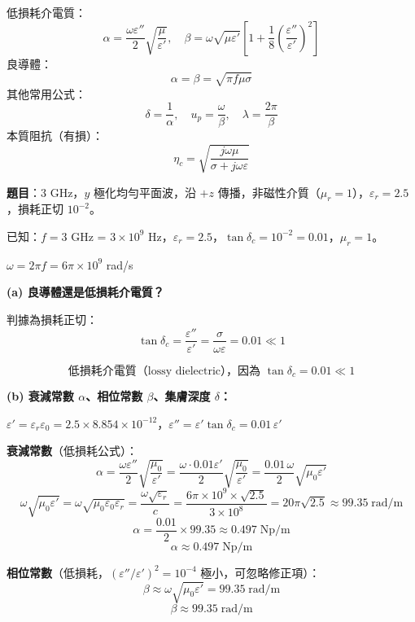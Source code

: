 \documentclass[12pt,a4paper]{article}
\begin{document}
\begin{formulabox}
低損耗介電質：
\[
  \alpha = \frac{\omega\varepsilon''}{2}\sqrt{\frac{\mu}{\varepsilon'}}, \quad
  \beta = \omega\sqrt{\mu\varepsilon'}\left[1 + \frac{1}{8}\left(\frac{\varepsilon''}{\varepsilon'}\right)^2\right]
\]
良導體：
\[
  \alpha = \beta = \sqrt{\pi f \mu \sigma}
\]
其他常用公式：
\[
  \delta = \frac{1}{\alpha}, \quad u_p = \frac{\omega}{\beta}, \quad \lambda = \frac{2\pi}{\beta}
\]
本質阻抗（有損）：
\[
  \eta_c = \sqrt{\frac{j\omega\mu}{\sigma + j\omega\varepsilon}}
\]
\end{formulabox}

\textbf{題目}：3 GHz，$y$ 極化均勻平面波，沿 $+z$ 傳播，非磁性介質（$\mu_r = 1$），$\varepsilon_r = 2.5$，損耗正切 $10^{-2}$。

\begin{solutionbox}[詳解]

已知：$f = 3$ GHz = $3\times10^9$ Hz，$\varepsilon_r = 2.5$，$\tan\delta_c = 10^{-2} = 0.01$，$\mu_r = 1$。

$\omega = 2\pi f = 6\pi \times 10^9$ rad/s

\textbf{(a) 良導體還是低損耗介電質？}

判據為損耗正切：
\[
  \tan\delta_c = \frac{\varepsilon''}{\varepsilon'} = \frac{\sigma}{\omega\varepsilon} = 0.01 \ll 1
\]

\[
  \boxed{\text{低損耗介電質（lossy dielectric），因為 } \tan\delta_c = 0.01 \ll 1}
\]

\textbf{(b) 衰減常數 $\alpha$、相位常數 $\beta$、集膚深度 $\delta$：}

$\varepsilon' = \varepsilon_r \varepsilon_0 = 2.5 \times 8.854\times10^{-12}$，$\varepsilon'' = \varepsilon'\tan\delta_c = 0.01\,\varepsilon'$

\textbf{衰減常數}（低損耗公式）：
\[
  \alpha = \frac{\omega\varepsilon''}{2}\sqrt{\frac{\mu_0}{\varepsilon'}}
  = \frac{\omega \cdot 0.01\varepsilon'}{2}\sqrt{\frac{\mu_0}{\varepsilon'}}
  = \frac{0.01\,\omega}{2}\sqrt{\mu_0\varepsilon'}
\]
\[
  \omega\sqrt{\mu_0\varepsilon'} = \omega\sqrt{\mu_0\varepsilon_0\varepsilon_r} = \frac{\omega\sqrt{\varepsilon_r}}{c}
  = \frac{6\pi\times10^9 \times \sqrt{2.5}}{3\times10^8}
  = 20\pi\sqrt{2.5} \approx 99.35 \;\text{rad/m}
\]
\[
  \alpha = \frac{0.01}{2}\times 99.35 \approx 0.497 \;\text{Np/m}
\]
\[
  \boxed{\alpha \approx 0.497 \;\text{Np/m}}
\]

\textbf{相位常數}（低損耗，$(\varepsilon''/\varepsilon')^2 = 10^{-4}$ 極小，可忽略修正項）：
\[
  \beta \approx \omega\sqrt{\mu_0\varepsilon'} = 99.35 \;\text{rad/m}
\]
\[
  \boxed{\beta \approx 99.35 \;\text{rad/m}}
\]


\end{solutionbox}
\end{document}

